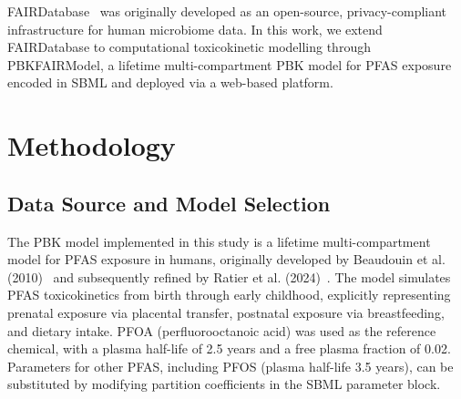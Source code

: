 \documentclass[preprint,12pt]{elsarticle}
\begin{document}
\begin{linenumbers}
FAIRDatabase~\cite{dorst2024, roman2026} was originally developed as
an open-source, privacy-compliant infrastructure for human microbiome
data. In this work, we extend FAIRDatabase to computational
toxicokinetic modelling through PBKFAIRModel, a lifetime
multi-compartment PBK model for PFAS exposure encoded in SBML and
deployed via a web-based platform.


\section{Methodology}\label{sec2}


\subsection{Data Source and Model Selection}


The PBK model implemented in this study is a lifetime multi-compartment
model for PFAS exposure in humans, originally developed by Beaudouin
et al. (2010)~\cite{beaudouin2010} and subsequently refined by Ratier
et al. (2024)~\cite{ratier2024}. The model simulates PFAS
toxicokinetics from birth through early childhood, explicitly
representing prenatal exposure via placental transfer, postnatal
exposure via breastfeeding, and dietary intake. PFOA
(perfluorooctanoic acid) was used as the reference chemical, with a
plasma half-life of 2.5 years and a free plasma fraction of 0.02.
Parameters for other PFAS, including PFOS (plasma half-life 3.5 years),
can be substituted by modifying partition coefficients in the SBML
parameter block.


\end{linenumbers}
\end{document}
